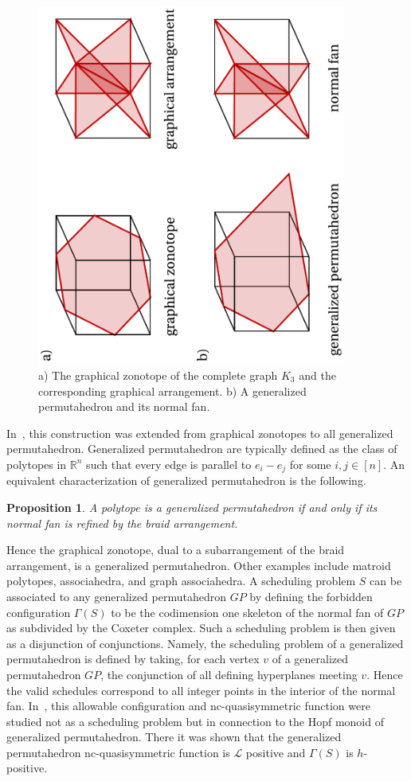 \documentclass[12pt,reqno]{amsart}
\numberwithin{definition}{section}
\newtheorem{proposition}[definition]{Proposition}
\theoremstyle{definition}
\newcommand{\ncL}{\mathcal{L}}
\newcommand{\forb}{\Gamma} %
\begin{document}
\begin{figure}[h]
\includegraphics[angle=270,width=4in]{zonotope_and_generalized_permutahedron}
\caption{a) The graphical zonotope of the complete graph $K_3$ and the corresponding graphical arrangement. b) A generalized permutahedron and its normal fan.}
\label{fig:normalfan}
\end{figure}


In~\cite{ABK}, this construction was extended from graphical zonotopes to all generalized
permutahedron.   Generalized permutahedron are typically
defined as the class of polytopes in $\mathbb{R}^n$ such that every
edge is parallel to $e_i - e_j$ for some $i,j \in [n]$.  An equivalent
characterization of generalized permutahedron is the following.
\begin{proposition}\cite{PRW,MPSSW}
 A
polytope is a generalized permutahedron if and only if its normal fan
is refined by the braid arrangement.
\end{proposition}
  Hence the
graphical zonotope, dual to a subarrangement of the braid arrangement,
is a generalized permutahedron.  Other examples include matroid
polytopes, associahedra, and graph associahedra.  A scheduling problem
$S$ can be associated to any generalized permutahedron $GP$ by
defining the forbidden configuration $\forb(S)$ to be the codimension
one skeleton of the normal fan of $GP$ as subdivided by the Coxeter
complex.  Such a scheduling problem is then given as a disjunction of
conjunctions.  Namely, the scheduling problem of a generalized
permutahedron is defined by taking, for each vertex $v$ of a
generalized permutahedron $GP$, the conjunction of all defining hyperplanes
meeting $v$.  Hence the valid  schedules correspond to all
integer points in the interior of the normal fan.  In~\cite{ABK}, this allowable configuration and nc-quasisymmetric function were studied not as a scheduling problem but in connection to the Hopf monoid of generalized permutahedron.  There it
was shown that the  generalized permutahedron nc-quasisymmetric function is $\ncL$
positive and $\forb(S)$ is $h$-positive.
\end{document}
